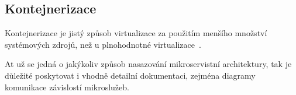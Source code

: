 \subsection{Kontejnerizace}\label{subsec:msa-deployment-containerization}
Kontejnerizace je jistý způsob virtualizace za použitím menšího množství systémových zdrojů, než u plnohodnotné virtualizace~\cite{kontejnerizace}.


At už se jedná o jakýkoliv způsob nasazování mikroservistní architektury, tak je důležité poskytovat i vhodně detailní dokumentaci, zejména diagramy komunikace závislostí mikroslužeb.
